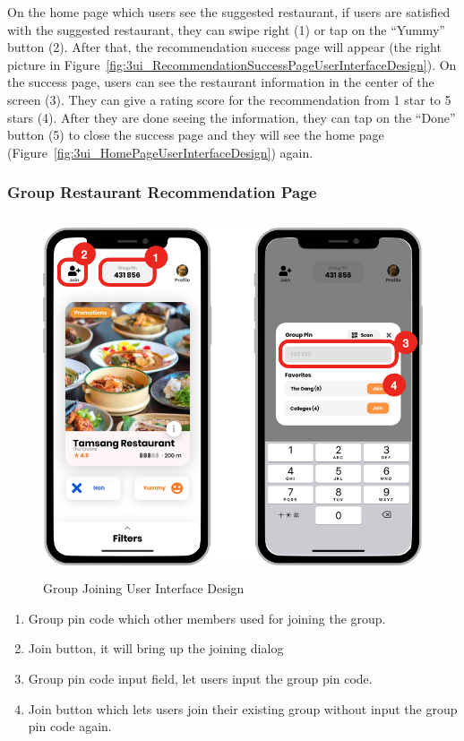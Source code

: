 \documentclass[12pt,oneside,openright,a4paper]{cpe-english-project}
\begin{document}
On the home page which users see the suggested restaurant, if users are satisfied with the suggested restaurant, they can swipe right (1) or tap on the “Yummy” button (2). After that, the recommendation success page will appear (the right picture in Figure~\ref{fig:3ui_RecommendationSuccessPageUserInterfaceDesign}). On the success page, users can see the restaurant information in the center of the screen (3). They can give a rating score for the recommendation from 1 star to 5 stars (4). After they are done seeing the information, they can tap on the “Done” button (5) to close the success page and they will see the home page (Figure~\ref{fig:3ui_HomePageUserInterfaceDesign}) again.

\newpage
\subsubsection{Group Restaurant Recommendation Page}
\begin{figure}[H]\centering
\includegraphics[height=300pt]{./images/3ui_GroupJoiningUserInterfaceDesign.png}
\caption{Group Joining User Interface Design}\label{fig:3ui_GroupJoiningUserInterfaceDesign}
\end{figure}

\begin{enumerate}
\item Group pin code which other members used for joining the group.
\item Join button, it will bring up the joining dialog
\item Group pin code input field, let users input the group pin code.
\item Join button which lets users join their existing group without input the group pin code again.
\end{enumerate}
\end{document}
